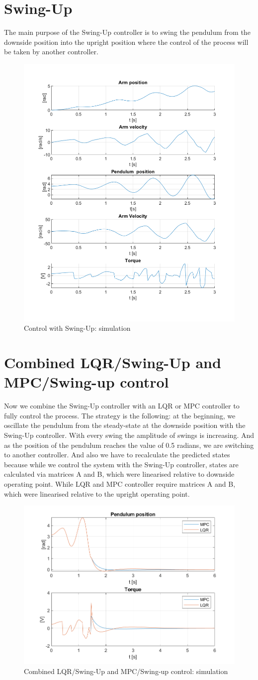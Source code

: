 \section{Swing-Up}
The main purpose of the Swing-Up controller is to swing the pendulum from the downside position into the upright position where the control of the process will be taken by another controller.
\begin{figure}[h]
	\centering
	\includegraphics[width=.6\linewidth]{images/Swing}
	\caption{Control with Swing-Up: simulation}
	\label{swing}
\end{figure}
\newpage
\section{Combined LQR/Swing-Up and MPC/Swing-up control}
Now we combine the Swing-Up controller with an LQR or MPC controller to fully control the process. The strategy is the following: at the beginning, we oscillate the pendulum from the steady-state at the downside position with the Swing-Up controller. With every swing the amplitude of swings is increasing. And as the position of the pendulum reaches the value of 0.5 radians, we are switching to another controller. And also we have to recalculate the predicted states because while we control the system with the Swing-Up controller, states are calculated via matrices A and B, which were linearised relative to downside operating point. While LQR and MPC controller require matrices A and B, which were linearised relative to the upright operating point.
\begin{figure}[h]
	\centering
	\includegraphics[width=.6\linewidth]{images/MPC-LQR_Swing}
	\caption{Combined LQR/Swing-Up and MPC/Swing-up control: simulation}
	\label{combo}
\end{figure}
\newpage
